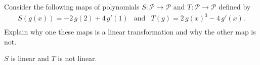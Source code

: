 
\begin{exerciseStatement}


Consider the following maps of polynomials \(S:\mathcal{P}\rightarrow\mathcal{P}\) and \(T:\mathcal{P}\rightarrow\mathcal{P}\) defined by 
\begin{align*} S(g(x))= -2 \, g\left(2\right) + 4 \, g'\left(1\right)  & \text{and} & T(g)= 2 \, g\left(x\right)^{3} - 4 \, g'\left(x\right) . \\ \end{align*}
             Explain why one these maps is a linear transformation and why the other map is not. 


\end{exerciseStatement}
    
\begin{exerciseAnswer} 


\(S\) is linear and \(T\) is not linear.


\end{exerciseAnswer}
    
